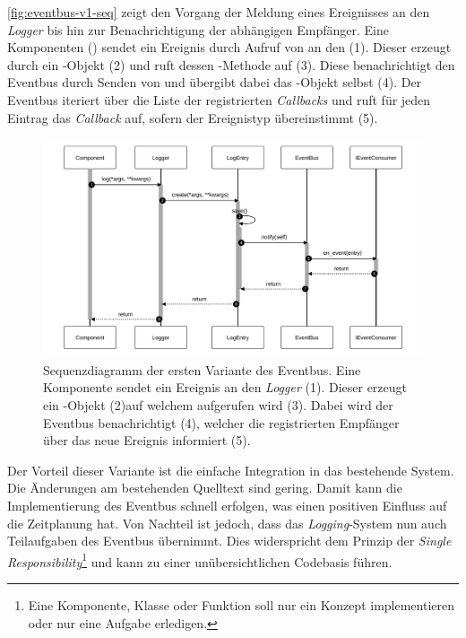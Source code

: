 \autoref{fig:eventbus-v1-seq} zeigt den Vorgang der Meldung eines Ereignisses an den \emph{Logger} bis hin zur Benachrichtigung der abhängigen Empfänger. Eine Komponenten () sendet ein Ereignis durch Aufruf von  an den  (1). Dieser erzeugt durch  ein -Objekt (2) und ruft dessen -Methode auf (3). Diese benachrichtigt den Eventbus durch Senden von  und übergibt dabei das -Objekt selbst (4). Der Eventbus iteriert über die Liste der registrierten \emph{Callbacks} und ruft für jeden Eintrag das \emph{Callback} auf, sofern der Ereignistyp übereinstimmt (5).\\

\begin{figure}[!ht]
	\centering
	\includegraphics[width=1.0\linewidth]{images/diagrams/eventbus-v1-seq.pdf}
	\caption{Sequenzdiagramm der ersten Variante des Eventbus. Eine Komponente sendet ein Ereignis an den \emph{Logger} (1). Dieser erzeugt ein -Objekt (2)auf welchem  aufgerufen wird (3). Dabei wird der Eventbus benachrichtigt (4), welcher die registrierten Empfänger über das neue Ereignis informiert (5).}
	\label{fig:eventbus-v1-seq}
\end{figure}

Der Vorteil dieser Variante ist die einfache Integration in das bestehende System. Die Änderungen am bestehenden Quelltext sind gering. Damit kann die Implementierung des Eventbus schnell erfolgen, was einen positiven Einfluss auf die Zeitplanung hat. Von Nachteil ist jedoch, dass das \emph{Logging}-System nun auch Teilaufgaben des Eventbus übernimmt. Dies widerspricht dem Prinzip der \emph{Single Responsibility}\footnote{Eine Komponente, Klasse oder Funktion soll nur ein Konzept implementieren oder nur eine Aufgabe erledigen.} und kann zu einer unübersichtlichen Codebasis führen.

